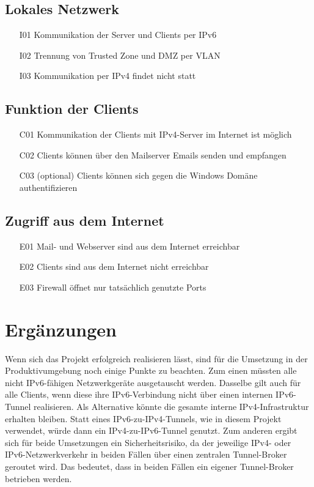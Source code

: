 \subsection{Lokales Netzwerk}
\begin{itemize}
	\item[I01] Kommunikation der Server und Clients per IPv6
	\item[I02] Trennung von Trusted Zone und DMZ per VLAN
	\item[I03] Kommunikation per IPv4 findet nicht statt
\end{itemize}
\subsection{Funktion der Clients}
\begin{itemize}
	\item[C01] Kommunikation der Clients mit IPv4-Server im Internet ist möglich
	\item[C02] Clients können über den Mailserver Emails senden und empfangen
	\item[C03] (optional) Clients können sich gegen die Windows Domäne authentifizieren
\end{itemize}
\subsection{Zugriff aus dem Internet}
\begin{itemize}
	\item[E01] Mail- und Webserver sind aus dem Internet erreichbar
	\item[E02] Clients sind aus dem Internet nicht erreichbar
	\item[E03] Firewall öffnet nur tatsächlich genutzte Ports
\end{itemize}

\section{Ergänzungen}

Wenn sich das Projekt erfolgreich realisieren lässt, sind für die Umsetzung in der Produktivumgebung noch einige Punkte zu beachten. Zum einen müssten alle nicht IPv6-fähigen Netzwerkgeräte ausgetauscht werden. Dasselbe gilt auch für alle Clients, wenn diese ihre IPv6-Verbindung nicht über einen internen IPv6-Tunnel realisieren. Als Alternative könnte die gesamte interne IPv4-Infrastruktur erhalten bleiben. Statt eines IPv6-zu-IPv4-Tunnels, wie in diesem Projekt verwendet, würde dann ein IPv4-zu-IPv6-Tunnel genutzt. Zum anderen ergibt sich für beide Umsetzungen ein Sicherheitsrisiko, da der jeweilige IPv4- oder IPv6-Netzwerkverkehr in beiden Fällen über einen zentralen Tunnel-Broker geroutet wird. Das bedeutet, dass in beiden Fällen ein eigener Tunnel-Broker betrieben werden.
